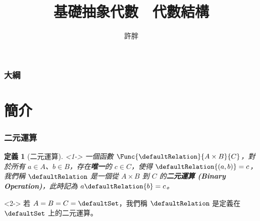 \documentclass[utf8]{beamer}
\begin{document}
\begin{CJK}{UTF8}{bkai}

\newtheorem{mydef}{定義}[section]
\newtheorem*{mydef*}{定義}
\newtheorem{myrule}[mydef]{原理}
\newtheorem{mythm}[mydef]{定理}
\newtheorem{mycorol}[mydef]{推論}
\renewenvironment{proof}{\textbf{證明}}{\qed}
\newenvironment{mysol}{\textbf{解答}}{\qed}
\newenvironment{mypropo}{\begin{exampleblock}{性質}}{\end{exampleblock}}
\newenvironment{myexample}{\begin{exampleblock}{範例}}{\end{exampleblock}}
\newenvironment{mynote*}{\begin{alertblock}{註}}{\end{alertblock}}



\title{基礎抽象代數　代數結構}
\author{許胖}

\begin{frame}
  \titlepage
\end{frame}
\begin{frame}
  \frametitle{大綱}
  \tableofcontents
\end{frame}

\section{簡介}

\begin{frame}
  \frametitle{二元運算}
  \begin{mydef}[二元運算]<1->
  \label{def:algebra:binary_operation}
  一個函數 $\Func{\defaultRelation}{A\times{B}}{C}$，對於所有 $a\in{A}$、$b\in{B}$，存在\textbf{唯一}的 $c\in{C}$，使得 $\defaultRelation{(a,b)}=c$，我們稱 $\defaultRelation$ 是一個從 $A\times{B}$ 到 $C$ 的\textbf{二元運算 (Binary Operation)}，此時記為 $a\defaultRelation{b}=c$。
  \end{mydef}
  \begin{mynote*}<2->
  若 $A=B=C=\defaultSet$，我們稱 $\defaultRelation$ 是定義在 $\defaultSet$ 上的二元運算。
  \end{mynote*}
\end{frame}


\end{CJK}
\end{document}
